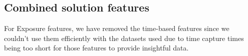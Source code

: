 %    

\subsection{Combined solution features}

For Exposure features, we have removed the time-based features since we couldn't use them efficiently with the datasets used due to time capture times being too short for those features to provide insightful data.\\\\

